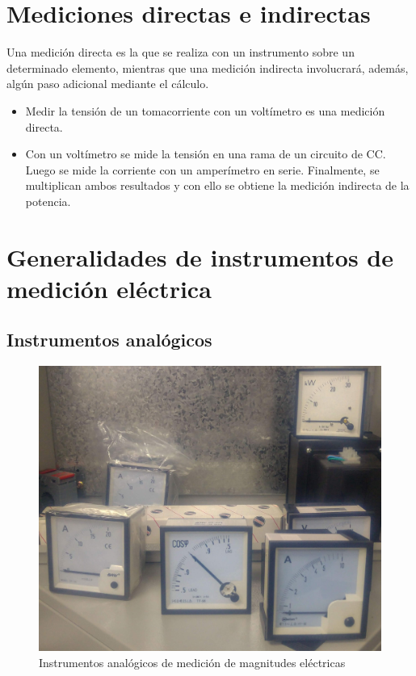 \section{Mediciones directas e indirectas}

Una medición directa es la que se realiza con un instrumento sobre un determinado elemento, mientras que una medición indirecta involucrará, además, algún paso adicional mediante el cálculo.
\begin{ejemplo}
	
	\begin{itemize}
	
		\item Medir la tensión de un tomacorriente con un voltímetro es una medición directa.
		\item Con un voltímetro se mide la tensión en una rama de un circuito de CC. Luego se mide la corriente con un amperímetro en serie. Finalmente, se multiplican ambos resultados y con ello se obtiene la medición indirecta de la potencia.
	\end{itemize}		
\end{ejemplo}

\section{Generalidades de instrumentos de medición eléctrica}

\subsection{Instrumentos analógicos}

\begin{figure}[htbp]
  \centering
  \includegraphics[width=\textwidth,height=\textheight,keepaspectratio]{images/fotos/analogicos.jpg}
  \caption{Instrumentos analógicos de medición de magnitudes eléctricas}
  \label{fig:instrumentos_analogicos}
\end{figure}

